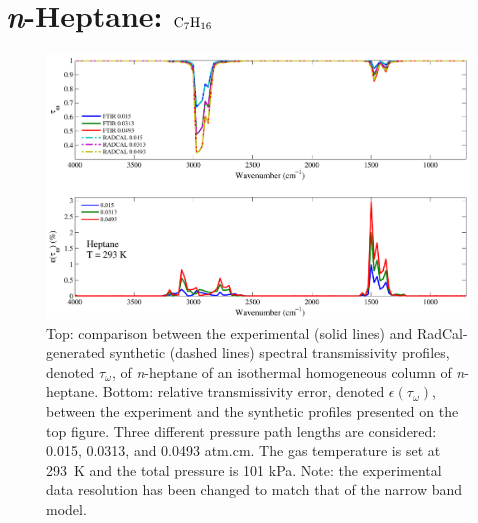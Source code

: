 \clearpage

\section{\textit{n}-Heptane: $\rm C_7H_{16}$}

\begin{figure}[h]
\includegraphics[width=\textwidth]{../Verification/Results_Test2/Heptane_293.pdf}
\caption{Top: comparison between the experimental (solid lines) and RadCal-generated synthetic (dashed lines) spectral transmissivity profiles, denoted $\tau_{\omega}$, of \textit{n}-heptane of an isothermal homogeneous column of \textit{n}-heptane. Bottom: relative transmissivity error, denoted $\epsilon{(\tau_{\omega})}$, between the experiment and the synthetic profiles presented on the top figure. Three different pressure path lengths are considered: 0.015, 0.0313, and 0.0493 atm.cm. The gas temperature is set at 293~K and the total pressure is 101 kPa. Note: the experimental data resolution has been changed to match that of the narrow band model. \label{fig:nheptane_Verify_293K}}
\end{figure}

\newpage

